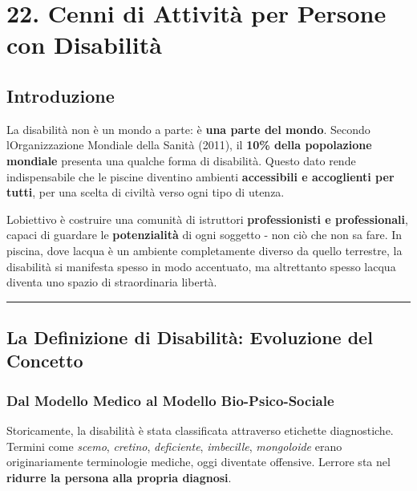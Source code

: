 \documentclass[a4paper,11pt]{article}
\begin{document}
\section{22. Cenni di Attività per Persone con
  Disabilità}\label{cenni-di-attivituxe0-per-persone-con-disabilituxe0}

\subsection{Introduzione}\label{introduzione-21}

La disabilità non è un mondo a parte: è \textbf{una parte del mondo}.
Secondo l\textquotesingle Organizzazione Mondiale della Sanità (2011),
il \textbf{10\% della popolazione mondiale} presenta una qualche forma
di disabilità. Questo dato rende indispensabile che le piscine diventino
ambienti \textbf{accessibili e accoglienti per tutti}, per una scelta di
civiltà verso ogni tipo di utenza.

L\textquotesingle obiettivo è costruire una comunità di istruttori
\textbf{professionisti e professionali}, capaci di guardare le
\textbf{potenzialità} di ogni soggetto - non ciò che non sa fare. In
piscina, dove l\textquotesingle acqua è un ambiente completamente
diverso da quello terrestre, la disabilità si manifesta spesso in modo
accentuato, ma altrettanto spesso l\textquotesingle acqua diventa uno
spazio di straordinaria libertà.

\begin{center}\rule{0.5\linewidth}{0.5pt}\end{center}

\subsection{La Definizione di Disabilità: Evoluzione del
      Concetto}\label{la-definizione-di-disabilituxe0-evoluzione-del-concetto}

\subsubsection{Dal Modello Medico al Modello
      Bio-Psico-Sociale}\label{dal-modello-medico-al-modello-bio-psico-sociale}

Storicamente, la disabilità è stata classificata attraverso etichette
diagnostiche. Termini come \emph{scemo}, \emph{cretino},
\emph{deficiente}, \emph{imbecille}, \emph{mongoloide} erano
originariamente terminologie mediche, oggi diventate offensive.
L\textquotesingle errore sta nel \textbf{ridurre la persona alla propria
      diagnosi}.
\end{document}
